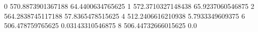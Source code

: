 0 570.8873901367188 64.4400634765625
1 572.3710327148438 65.9237060546875
2 564.2838745117188 57.8365478515625
4 512.2406616210938 5.7933349609375
6 506.478759765625 0.03143310546875
8 506.44732666015625 0.0
